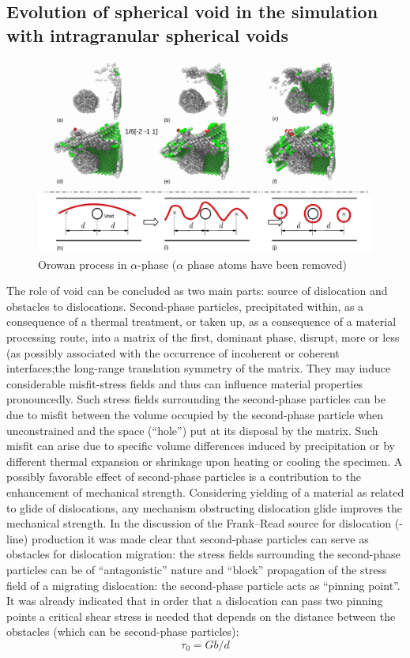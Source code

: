 \documentclass[materials,article,submit,moreauthors,pdftex,10pt,a4paper]{Definitions/mdpi}
\begin{document}
\subsection{Evolution of spherical void in the simulation with intragranular spherical voids}

\begin{figure}[ht]
	\centering
	\includegraphics[width=1\linewidth]{"img/dis-void2"}
	\caption{Orowan process in $\alpha$-phase ($\alpha$ phase atoms have been removed)}
	\label{fig:orowan}
\end{figure}

The role of void can be concluded as two main parts: source of dislocation and obstacles to dislocations.  Second-phase particles, precipitated within, as a consequence of a thermal treatment, or taken up, as a consequence of a material processing route, into a matrix of the first, dominant phase, disrupt, more or less (as possibly associated with the occurrence of incoherent or coherent interfaces;the long-range translation symmetry of the matrix. They may induce considerable misfit-stress fields and thus can influence material properties pronouncedly. Such stress fields surrounding the second-phase particles can be due to misfit between the volume occupied by the second-phase particle when unconstrained and the space (“hole”) put at its disposal by the matrix. Such misfit can arise due to specific volume differences induced by precipitation or by different thermal expansion or shrinkage upon heating or cooling the specimen. A possibly favorable effect of second-phase particles is a contribution to the enhancement of mechanical strength. Considering yielding of a material as related to glide of dislocations, any mechanism obstructing dislocation glide improves the mechanical strength. In the discussion of the Frank–Read source for dislocation (-line) production  it was made clear that second-phase particles can serve as obstacles for dislocation migration: the stress fields surrounding the second-phase particles can be of “antagonistic” nature and “block” propagation of the stress field of a migrating dislocation: the second-phase particle acts as “pinning point”. It was already indicated that in order that a dislocation can pass two pinning points a critical shear stress is needed that depends on the distance between the obstacles (which can be second-phase particles):
\begin{equation} \label{eq:orowan} 
\tau_0 = Gb/d
\end{equation}
\end{document}
